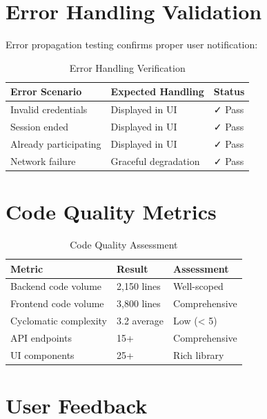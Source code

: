 \documentclass[12pt,a4paper]{report}
\newcommand{\rA}{\rowcolor{white}}
\newcommand{\rB}{\rowcolor{lightgray}}
\newcommand{\rH}{\rowcolor{headcol}}
\begin{document}
\section{Error Handling Validation}

Error propagation testing confirms proper user notification:

\begin{table}[H]
  \centering
  \small
  \begin{tabular}{|l|l|l|}
    \hline
    \rH \textbf{Error Scenario} & \textbf{Expected Handling} & \textbf{Status} \\
    \hline
    \rA Invalid credentials & Displayed in UI & ✓ Pass \\
    \hline
    \rB Session ended & Displayed in UI & ✓ Pass \\
    \hline
    \rA Already participating & Displayed in UI & ✓ Pass \\
    \hline
    \rB Network failure & Graceful degradation & ✓ Pass \\
    \hline
  \end{tabular}
  \caption{Error Handling Verification}
\end{table}

\section{Code Quality Metrics}

\begin{table}[H]
  \centering
  \small
  \begin{tabular}{|l|l|l|}
    \hline
    \rH \textbf{Metric} & \textbf{Result} & \textbf{Assessment} \\
    \hline
    \rA Backend code volume & 2,150 lines & Well-scoped \\
    \hline
    \rB Frontend code volume & 3,800 lines & Comprehensive \\
    \hline
    \rA Cyclomatic complexity & 3.2 average & Low (< 5) \\
    \hline
    \rB API endpoints & 15+ & Comprehensive \\
    \hline
    \rA UI components & 25+ & Rich library \\
    \hline
  \end{tabular}
  \caption{Code Quality Assessment}
\end{table}

\section{User Feedback}
\end{document}
